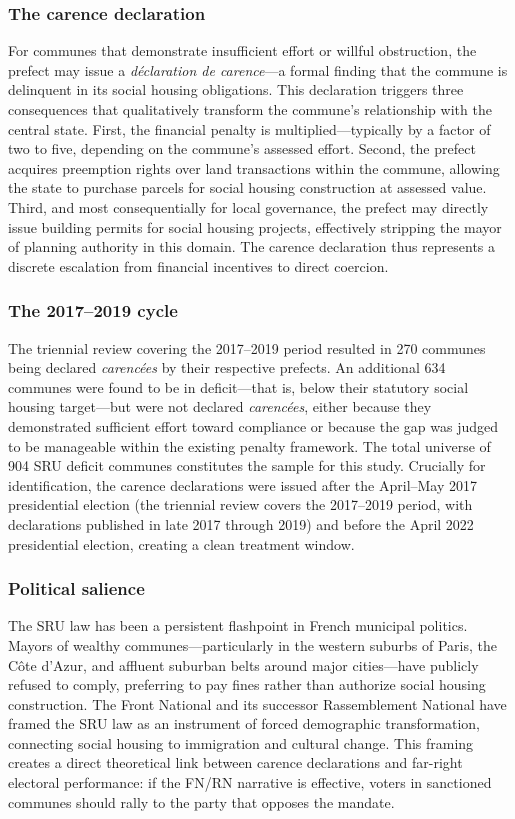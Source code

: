 \documentclass[12pt]{article}
\begin{document}
\subsubsection*{The carence declaration} For communes that demonstrate insufficient effort or willful obstruction, the prefect may issue a \textit{d\'{e}claration de carence}---a formal finding that the commune is delinquent in its social housing obligations. This declaration triggers three consequences that qualitatively transform the commune's relationship with the central state. First, the financial penalty is multiplied---typically by a factor of two to five, depending on the commune's assessed effort. Second, the prefect acquires preemption rights over land transactions within the commune, allowing the state to purchase parcels for social housing construction at assessed value. Third, and most consequentially for local governance, the prefect may directly issue building permits for social housing projects, effectively stripping the mayor of planning authority in this domain. The carence declaration thus represents a discrete escalation from financial incentives to direct coercion.

\subsubsection*{The 2017--2019 cycle} The triennial review covering the 2017--2019 period resulted in 270 communes being declared \textit{caren\-c\'{e}es} by their respective prefects. An additional 634 communes were found to be in deficit---that is, below their statutory social housing target---but were not declared \textit{caren\-c\'{e}es}, either because they demonstrated sufficient effort toward compliance or because the gap was judged to be manageable within the existing penalty framework. The total universe of 904 SRU deficit communes constitutes the sample for this study. Crucially for identification, the carence declarations were issued after the April--May 2017 presidential election (the triennial review covers the 2017--2019 period, with declarations published in late 2017 through 2019) and before the April 2022 presidential election, creating a clean treatment window.

\subsubsection*{Political salience} The SRU law has been a persistent flashpoint in French municipal politics. Mayors of wealthy communes---particularly in the western suburbs of Paris, the C\^{o}te d'Azur, and affluent suburban belts around major cities---have publicly refused to comply, preferring to pay fines rather than authorize social housing construction. The Front National and its successor Rassemblement National have framed the SRU law as an instrument of forced demographic transformation, connecting social housing to immigration and cultural change. This framing creates a direct theoretical link between carence declarations and far-right electoral performance: if the FN/RN narrative is effective, voters in sanctioned communes should rally to the party that opposes the mandate.
\end{document}
